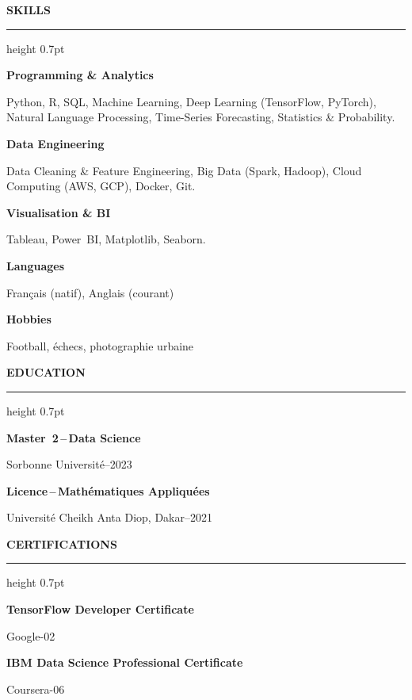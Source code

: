 \documentclass[11pt,a4paper]{article}
\newcommand{\sectiontitle}[1]{%
  \vspace{1em}\textbf{\uppercase{#1}}\par\vspace{.2em}
  \hrule height 0.7pt\relax\vspace{.8em}}
\newcommand{\edu}[3]{%
  \textbf{#1}\par
  {\small #2}\hfill\faCalendar\;#3\par\vspace{.8em}}
\begin{document}
\begin{minipage}[t]{0.47\textwidth}
\sectiontitle{Skills}

\textbf{Programming \& Analytics}\par
Python, R, SQL, Machine Learning, Deep Learning (TensorFlow, PyTorch), Natural Language Processing, Time-Series Forecasting, Statistics \& Probability.

\vspace{.6em}
\textbf{Data Engineering}\par
Data Cleaning \& Feature Engineering, Big Data (Spark, Hadoop), Cloud Computing (AWS, GCP), Docker, Git.

\vspace{.6em}
\textbf{Visualisation \& BI}\par
Tableau, Power~BI, Matplotlib, Seaborn.

\vspace{.6em}
\textbf{Languages}\par
Français (natif), Anglais (courant)

\vspace{.6em}
\textbf{Hobbies}\par
Football, échecs, photographie urbaine
\end{minipage}
\hfill
\begin{minipage}[t]{0.47\textwidth}
\sectiontitle{Education}

\edu{Master~2\,–\,Data Science}
    {Sorbonne Université}
    {2022–2023}

\edu{Licence\,–\,Mathématiques Appliquées}
    {Université Cheikh Anta Diop, Dakar}
    {2018–2021}

\sectiontitle{Certifications}

\textbf{TensorFlow Developer Certificate}\par
{\small Google}\hfill\faCalendar{}-02\par\vspace{.6em}

\textbf{IBM Data Science Professional Certificate}\par
{\small Coursera}\hfill\faCalendar{}-06\par

\end{minipage}
\end{document}

